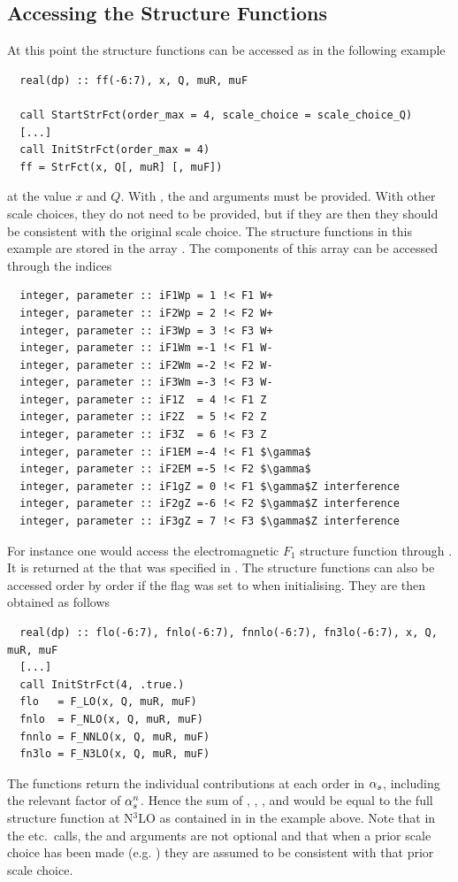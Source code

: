\subsection{Accessing the Structure Functions}
\label{sec:structure-funcs-access}
At this point the structure functions can be accessed as in the following example
\begin{lstlisting}
  real(dp) :: ff(-6:7), x, Q, muR, muF
  
  call StartStrFct(order_max = 4, scale_choice = scale_choice_Q)
  [...]
  call InitStrFct(order_max = 4)
  ff = StrFct(x, Q[, muR] [, muF])
\end{lstlisting}
at the value $x$ and $Q$.
%
With , the  and 
arguments must be provided.
%
With other scale choices, they do not need to be provided, but if they
are then they should be consistent with the original scale choice.
%
The structure functions in this example are stored in the
array . The components of this array can be accessed through
the indices 
\begin{lstlisting}
  integer, parameter :: iF1Wp = 1 !< F1 W+
  integer, parameter :: iF2Wp = 2 !< F2 W+
  integer, parameter :: iF3Wp = 3 !< F3 W+
  integer, parameter :: iF1Wm =-1 !< F1 W-
  integer, parameter :: iF2Wm =-2 !< F2 W-
  integer, parameter :: iF3Wm =-3 !< F3 W-
  integer, parameter :: iF1Z  = 4 !< F1 Z 
  integer, parameter :: iF2Z  = 5 !< F2 Z
  integer, parameter :: iF3Z  = 6 !< F3 Z
  integer, parameter :: iF1EM =-4 !< F1 $\gamma$
  integer, parameter :: iF2EM =-5 !< F2 $\gamma$
  integer, parameter :: iF1gZ = 0 !< F1 $\gamma$Z interference
  integer, parameter :: iF2gZ =-6 !< F2 $\gamma$Z interference
  integer, parameter :: iF3gZ = 7 !< F3 $\gamma$Z interference
\end{lstlisting}
For instance one would access the electromagnetic $F_1$ structure
function through . It is returned at the 
that was specified in .
%
The structure functions can also be accessed order by order if the
 flag was set to  when initialising.
%
They are then obtained as follows
\begin{lstlisting}
  real(dp) :: flo(-6:7), fnlo(-6:7), fnnlo(-6:7), fn3lo(-6:7), x, Q, muR, muF
  [...]
  call InitStrFct(4, .true.)
  flo   = F_LO(x, Q, muR, muF)
  fnlo  = F_NLO(x, Q, muR, muF)
  fnnlo = F_NNLO(x, Q, muR, muF)
  fn3lo = F_N3LO(x, Q, muR, muF)
\end{lstlisting}
The functions return the individual contributions at each order in
$\alpha_s$, including the relevant factor of $\alpha_s^n$.
%
Hence the sum of , , , and
 would be equal to the full structure function at N$^3$LO as
contained in  in the example above.
%
Note that in the  etc.\ calls, the  and 
arguments are not optional and that when a prior scale choice has been
made (e.g. ) they are assumed to be consistent
with that prior scale choice.


